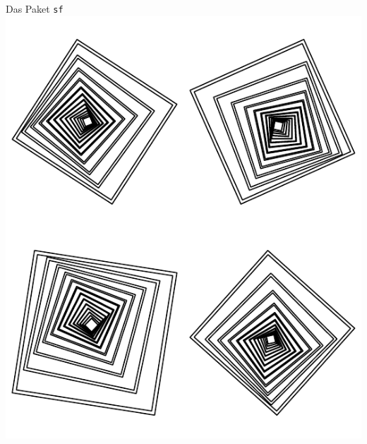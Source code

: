 \documentclass[ignorenonframetext,]{beamer}
\begin{document}
\begin{frame}[fragile]{Das Paket \texttt{sf}}
\includegraphics{figure/Rplot.pdf}

\end{frame}
\end{document}
